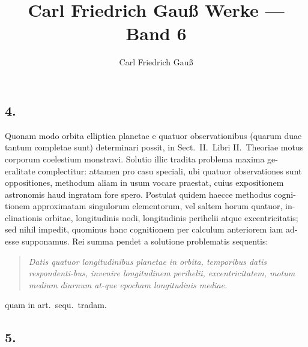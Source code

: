 \documentclass[12pt,a4paper]{article}
\title{Carl Friedrich Gau\ss{} Werke --- Band 6}
\author{Carl Friedrich Gau\ss{}}
\date{}
\begin{document}
\maketitle
\thispagestyle{empty}


\subsection*{4.}

Quonam modo orbita elliptica planetae e quatuor observationibus (quarum
duae tantum completae sunt) determinari possit, in Sect.~II.\ Libri II.\ Theoriae
motus corporum coelestium monstravi. Solutio illic tradita problema maxima ge-
eralitate complectitur: attamen pro casu speciali, ubi quatuor observationes
sunt oppositiones, methodum aliam in usum vocare praestat, cuius expositionem
astronomis haud ingratam fore spero. Postulat quidem haecce methodus cogni-
tionem approximatam singulorum elementorum, vel saltem horum quatuor, in-
clinationis orbitae, longitudinis nodi, longitudinis perihelii atque excentricitatis;
sed nihil impedit, quominus hanc cognitionem per calculum anteriorem iam ad-
esse supponamus. Rei summa pendet a solutione problematis sequentis:

\begin{quote}
\textit{Datis quatuor longitudinibus planetae in orbita, temporibus datis respondenti-\/bus, invenire longitudinem perihelii, excentricitatem, motum medium diurnum at-\/que epocham longitudinis mediae.}
\end{quote}

quam in art.\ sequ.\ tradam.

\subsection*{5.}
\end{document}
